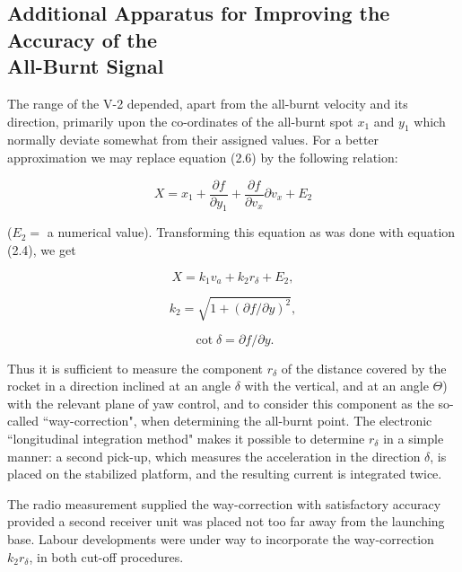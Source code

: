 \documentclass[12pt, a4paper]{article}
\begin{document}
\subsection[Additional Apparatus for Improving the Accuracy of the All-Burnt Signal]{Additional Apparatus for Improving the Accuracy of the\\All-Burnt Signal}

The range of the V-2 depended, apart from the all-burnt velocity and its direction, primarily upon the co-ordinates of the all-burnt spot $x_{1}$ and $y_{1}$ which normally deviate somewhat from their assigned values. For a better approximation we may replace equation (2.6) by the following relation:

\begin{equation}
  X=x_{1}+\frac{\partial f}{\partial y_{1}}+\frac{\partial f}{\partial v_{x}}\partial v_{x}+E_{2}
\end{equation}

($E_{2}=$ a numerical value). Transforming this equation as was done with equation (2.4), we get

\begin{equation}
  X=k_{1}v_{a}+k_{2}r_{\delta}+E_{2},
\end{equation}

\begin{equation}
  k_{2}=\sqrt{1+(\partial f/\partial y)^{2}},
\end{equation}

\begin{equation}
  \cot{\delta}=\partial  f/ \partial y.
\end{equation}

Thus it is sufficient to measure the component $r_{\delta}$ of the distance covered by the rocket in a direction inclined at an angle $\delta$ with the vertical, and at an angle $\Theta$) with the relevant plane of yaw control, and to consider this component as the so-called ``way-correction", when determining the all-burnt point. The electronic ``longitudinal integration method" makes it possible to determine $r_{\delta}$ in a simple manner: a second pick-up, which measures the acceleration in the direction $\delta$, is placed on the stabilized platform, and the resulting current is integrated twice.

The radio measurement supplied the way-correction with satisfactory accuracy provided a second receiver unit was placed not too far away from the launching base. Labour developments were under way to incorporate the way-correction $k_{2}r_{\delta}$, in both cut-off procedures.
\end{document}
